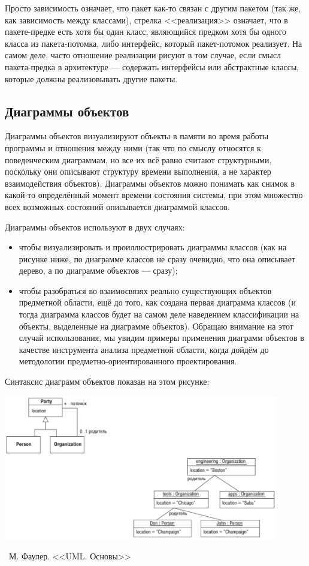 \documentclass[a5paper]{article}
\newcommand{\attribution}[1] {
    \vspace{-5mm}\begin{flushright}\begin{scriptsize}%
    {\textcopyright\, #1}\end{scriptsize}\end{flushright}
}
\begin{document}
Просто зависимость означает, что пакет как-то связан с другим пакетом (так же, как зависимость между классами), стрелка <<реализация>> означает, что в пакете-предке есть хотя бы один класс, являющийся предком хотя бы одного класса из пакета-потомка, либо интерфейс, который пакет-потомок реализует. На самом деле, часто отношение реализации рисуют в том случае, если смысл пакета-предка в архитектуре --- содержать интерфейсы или абстрактные классы, которые должны реализовывать другие пакеты.

\subsection{Диаграммы объектов}

Диаграммы объектов визуализируют объекты в памяти во время работы программы и отношения между ними (так что по смыслу относятся к поведенческим диаграммам, но все их всё равно считают структурными, поскольку они описывают структуру времени выполнения, а не характер взаимодействия объектов). Диаграммы объектов можно понимать как снимок в какой-то определённый момент времени состояния системы, при этом множество всех возможных состояний описывается диаграммой классов.

Диаграммы объектов используют в двух случаях:

\begin{itemize}
    \item чтобы визуализировать и проиллюстрировать диаграммы классов (как на рисунке ниже, по диаграмме классов не сразу очевидно, что она описывает дерево, а по диаграмме объектов --- сразу);
    \item чтобы разобраться во взаимосвязях реально существующих объектов предметной области, ещё до того, как создана первая диаграмма классов (и тогда диаграмма классов будет на самом деле наведением классификации на объекты, выделенные на диаграмме объектов). Обращаю внимание на этот случай использования, мы увидим примеры применения диаграмм объектов в качестве инструмента анализа предметной области, когда дойдём до методологии предметно-ориентированного проектирования.
\end{itemize}

Синтаксис диаграмм объектов показан на этом рисунке:

\begin{center}
    \includegraphics[width=0.9\textwidth]{objectDiagrams.png}
    \attribution{М. Фаулер. <<UML. Основы>>}
\end{center}
\end{document}

